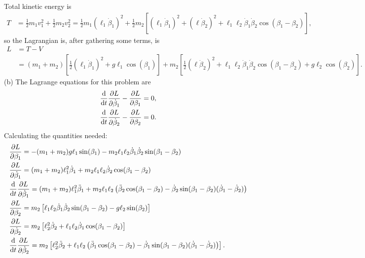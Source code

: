 \documentclass{article}
\begin{document}
        Total kinetic energy is
        \begin{align*}            
            T &= \frac{1}{2}m_1 v_1^2 + \frac{1}{2}m_2 v_2^2 = \frac{1}{2}m_1 (\ell_1 \dot \beta_1)^2 + \frac{1}{2}m_2 \left[ (\ell_1 \dot \beta_1)^2+  (\ell \dot \beta_2)^2 + \ell_1 \ell_2 \dot \beta_1 \dot \beta_2 \cos(\beta_1 - \beta_2)\right],
        \end{align*}
        so the Lagrangian is, after gathering some terms, is
        \begin{align*}
            L &= T - V  \\
            &= (m_1 + m_2) \left[\frac{1}{2}(\ell_1 \dot \beta_1)^2 + g \ell_1 \cos(\beta_1)  \right] 
            + m_2 \left[\frac{1}{2} (\ell \dot \beta_2)^2 + \ell_1 \ell_2 \dot \beta_1 \dot \beta_2 \cos(\beta_1 - \beta_2) + g \ell_2 \cos(\beta_2)\right].
        \end{align*}
        (b) The Lagrange equations for this problem are
        \begin{align*}
            & \dv{t} \pdv{L}{\dot \beta_1} - \pdv{L}{\beta_1} = 0, \\
            & \dv{t} \pdv{L}{\dot \beta_2} - \pdv{L}{\beta_2} = 0.
        \end{align*}
        Calculating the quantities needed:
        \begin{align*}
            & \pdv{L}{\beta_1} = -(m_1 + m_2) g \ell_1 \sin(\beta_1) - m_2 \ell_1 \ell_2 \dot \beta_1 \dot \beta_2 \sin(\beta_1 - \beta_2) \\
            & \pdv{L}{\dot \beta_1} = (m_1 + m_2) \ell_1^2 \dot \beta_1 + m_2 \ell_1 \ell_2 \dot \beta_2 \cos(\beta_1 - \beta_2) \\
            & \dv{t} \pdv{L}{\dot \beta_1} = (m_1 + m_2) \ell_1^2 \ddot \beta_1 + m_2 \ell_1 \ell_2 \left( \ddot \beta_2 \cos(\beta_1 - \beta_2) - \dot \beta_2 \sin(\beta_1 - \beta_2)(\dot \beta_1 - \dot \beta_2) \right)\\
            & \pdv{L}{\beta_2} =  m_2 \left[ \ell_1 \ell_2 \dot \beta_1 \dot \beta_2 \sin(\beta_1 - \beta_2)  - g \ell_2 \sin(\beta_2)\right]\\
            & \pdv{L}{\dot \beta_2} = m_2 \left[\ell_2^2 \dot \beta_2 + \ell_1 \ell_2 \dot \beta_1 \cos(\beta_1 - \beta_2)\right] \\
            & \dv{t} \pdv{L}{\dot \beta_2} = m_2 \left[ \ell_2^2 \ddot \beta_2 + \ell_1 \ell_2 \left(\ddot \beta_1\cos(\beta_1 - \beta_2) - \dot \beta_1 \sin(\beta_1 - \beta_2) (\dot \beta_1 - \dot \beta_2)\right) \right].
        \end{align*}
\end{document}
